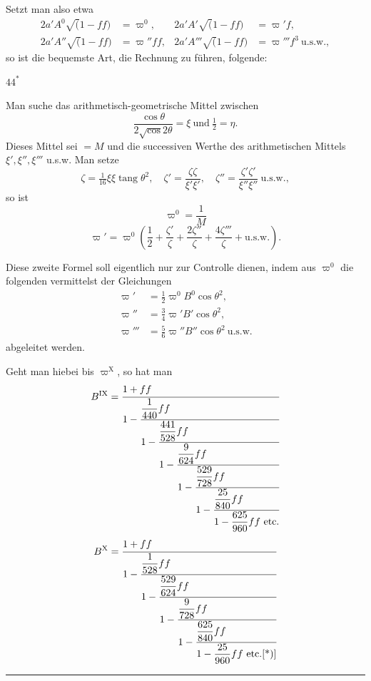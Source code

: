 Setzt man also etwa
\[
\begin{aligned}
2a'A^0\surd(1-ff)&=\varpi^0,&2a'A'\surd(1-ff)&=\varpi'f,\\
2a'A''\surd(1-ff)&=\varpi''ff,&2a'A'''\surd(1-ff)&=\varpi'''f^3\ \text{u.s.w.},
\end{aligned}
\]
\noindent so ist die bequemste Art, die Rechnung zu führen, folgende:
\par\medskip\hfill $44^{*}$\par
\clearpage{}
Man suche das arithmetisch-geometrische Mittel zwischen
\[\frac{\cos\theta}{2\surd\cos2\theta}=\xi\ \text{und}\ \tfrac12=\eta.\]
\noindent Dieses Mittel sei $=M$ und die successiven Werthe des arithmetischen Mittels $\xi',\xi'',\xi'''$ u.s.w. Man setze
\[
\zeta=\tfrac1{16}\xi\xi\operatorname{tang}\theta^2,\quad
\zeta'=\frac{\zeta\zeta}{\xi'\xi'},\quad
\zeta''=\frac{\zeta'\zeta'}{\xi''\xi''}\ \text{u.s.w.},
\]
\noindent so ist
\begin{equation}
\varpi^0=\frac1M\tag*{I}
\end{equation}
\begin{equation}
\varpi'=\varpi^0\left(\frac12+\frac{\zeta'}{\zeta}+\frac{2\zeta''}{\zeta}+\frac{4\zeta'''}{\zeta}+\text{u.s.w.}\right).
\tag*{II}
\end{equation}
\noindent {\small [S. 44]}\par
Diese zweite Formel soll eigentlich nur zur Controlle dienen, indem aus $\varpi^0$ die folgenden vermittelst der Gleichungen
\[
\begin{aligned}
\varpi'&=\tfrac12\varpi^0B^0\cos\theta^2,\\
\varpi''&=\tfrac34\varpi'B'\cos\theta^2,\\
\varpi'''&=\tfrac56\varpi''B''\cos\theta^2\ \text{u.s.w.}
\end{aligned}
\]
\noindent abgeleitet werden.

Geht man hiebei bis $\varpi^{\mathrm{X}}$, so hat man
\[
B^{\mathrm{IX}}=\cfrac[l]{1+ff}{1-\cfrac[l]{\dfrac{1}{440}ff}
 {1-\cfrac[l]{\dfrac{441}{528}ff}
 {1-\cfrac[l]{\dfrac{9}{624}ff}
 {1-\cfrac[l]{\dfrac{529}{728}ff}
 {1-\cfrac[l]{\dfrac{25}{840}ff}
 {1-\dfrac{625}{960}ff\ \mathrm{etc.}}}}}}}
\]
\clearpage{}
\[
B^{\mathrm{X}}=\cfrac[l]{1+ff}{1-\cfrac[l]{\dfrac{1}{528}ff}
 {1-\cfrac[l]{\dfrac{529}{624}ff}
 {1-\cfrac[l]{\dfrac{9}{728}ff}
 {1-\cfrac[l]{\dfrac{625}{840}ff}
 {1-\dfrac{25}{960}ff\ \mathrm{etc.}\text{[*)]}}}}}}
\]
\ClosingRule
\par\medskip\noindent\rule{.25\linewidth}{.4pt}\par\smallskip
{\small\noindent [*) In der Handschrift folgt hier die durchgeführte Rechnung für das Beispiel $\theta=36^0\,20'$.]}
\clearpage
\endgroup
